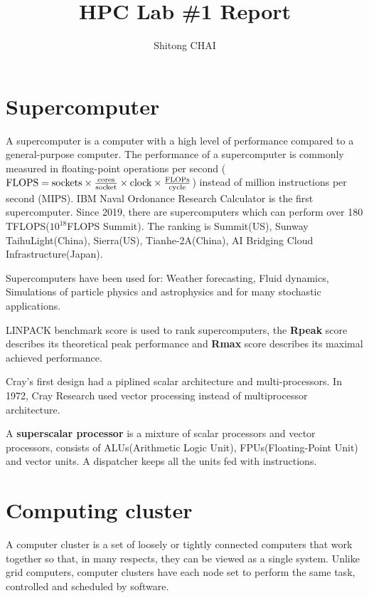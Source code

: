 \documentclass{article}
\title{HPC Lab \#1 Report}
\date{}
\author{Shitong CHAI}
\begin{document}
\maketitle

\section{Supercomputer}
A supercomputer is a computer with a high level of performance compared to a general-purpose computer. The performance of a supercomputer is commonly measured in floating-point operations per second ($\textup{FLOPS}=\textup{sockets} \times \frac{\textup{cores}}{\textup{socket}} \times \textup{clock} \times \frac{\textup{FLOPs}}{\textup{cycle}}$) instead of million instructions per second (MIPS). IBM Naval Ordonance Research Calculator is the first supercomputer. Since 2019, there are supercomputers which can perform over 180 TFLOPS($10^{18}$FLOPS Summit). The ranking is Summit(US), Sunway TaihuLight(China), Sierra(US), Tianhe-2A(China), AI Bridging Cloud Infrastructure(Japan).

Supercomputers have been used for: Weather forecasting, Fluid dynamics, Simulations of particle physics and astrophysics and for many stochastic applications. 

LINPACK benchmark score is used to rank supercomputers, the \textbf{Rpeak} score describes its theoretical peak performance and \textbf{Rmax} score describes its maximal achieved performance.

Cray's first design had a piplined scalar architecture and multi-processors. In 1972, Cray Research used vector processing instead of multiprocessor architecture. 

A \textbf{superscalar processor} is a mixture of scalar processors and vector processors, consists of ALUs(Arithmetic Logic Unit), FPUs(Floating-Point Unit) and vector units. A dispatcher keeps all the units fed with instructions.

\section{Computing cluster}
A computer cluster is a set of loosely or tightly connected computers that work together so that, in many respects, they can be viewed as a single system. Unlike grid computers, computer clusters have each node set to perform the same task, controlled and scheduled by software. 
\end{document}
